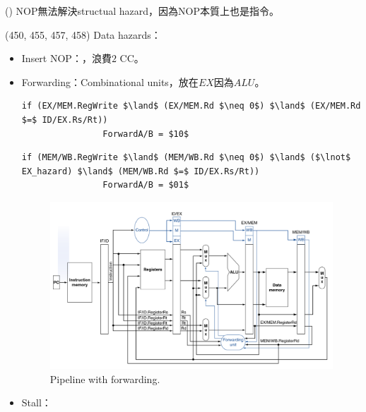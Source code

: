 \item \begin{theorem}{()} NOP無法解決structual hazard，因為NOP本質上也是指令。
\end{theorem}

\item \begin{theorem}{(450, 455, 457, 458)} Data hazards：\begin{itemize}
        \item Insert NOP：，浪費$2$ CC。
        \item Forwarding：Combinational units，放在$EX$因為$ALU$。
        \begin{lstlisting}[caption={EX hazard.}, captionpos=b, mathescape=true, language={[x86masm]Assembler}]
            if (EX/MEM.RegWrite $\land$ (EX/MEM.Rd $\neq 0$) $\land$ (EX/MEM.Rd $=$ ID/EX.Rs/Rt))
                ForwardA/B = $10$
        \end{lstlisting}
        \begin{lstlisting}[caption={MEM hazard.}, captionpos=b, mathescape=true, language={[x86masm]Assembler}]
            if (MEM/WB.RegWrite $\land$ (MEM/WB.Rd $\neq 0$) $\land$ ($\lnot$ EX_hazard) $\land$ (MEM/WB.Rd $=$ ID/EX.Rs/Rt))
                ForwardA/B = $01$
        \end{lstlisting}
        \begin{figure}[H]
            \centering
            \includegraphics[scale=0.3]{img/pipeline-forward.png}
            \caption{Pipeline with forwarding.}
            \label{img:pipeline-forward}
        \end{figure}
        \item Stall：\code{}
        \begin{lstlisting}[caption={Stall.}, captionpos=b, mathescape=true, language={[x86masm]Assembler}]

\end{lstlisting}
\end{itemize}
\end{theorem}
